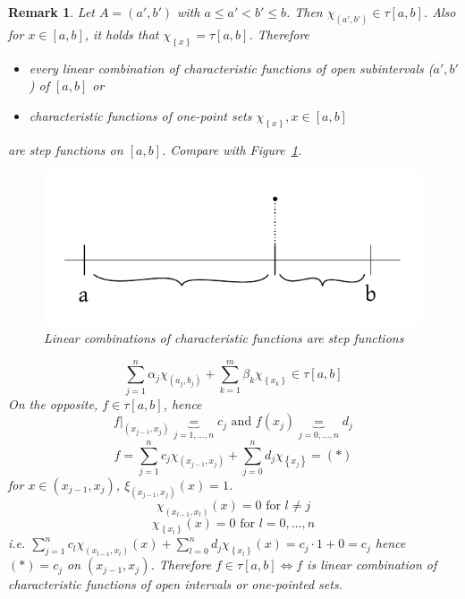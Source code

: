 \documentclass{article}
\newtheorem{remark}{Remark}  \numberwithin{remark}{section}
\newcommand{\set}[1]{\left\{#1\right\}}
\begin{document}
\begin{remark}
  Let $A = (a', b')$ with $a \leq a' < b' \leq b$.
  Then $\chi_{(a',b')} \in \tau[a,b]$. Also for $x \in [a,b]$, it holds that $\chi_{\set{x}} = \tau[a,b]$.
  Therefore
  \begin{itemize}
    \item every linear combination of characteristic functions of open subintervals ($a',b'$) of $[a,b]$ or
    \item characteristic functions of one-point sets $\chi_{\set{x}}, x \in [a,b]$
  \end{itemize}
  are step functions on $[a,b]$. Compare with Figure~\ref{img:linchar}.

  \begin{figure}[t]
    \begin{center}
      \includegraphics{img/13b_char_function_as_step_function.pdf}
      \caption{Linear combinations of characteristic functions are step functions}
      \label{img:linchar}
    \end{center}
  \end{figure}

  \[ \sum_{j=1}^n \alpha_j \chi_{(a_j,b_j)} + \sum_{k=1}^m \beta_k \chi_{\set{x_k}} \in \tau[a,b] \]
  On the opposite, $f \in \tau[a,b]$, hence
  \[ f|_{(x_{j-1},x_j)} \underbrace{=}_{j=1,\dots,n} c_j \text{ and } f(x_j) \underbrace{=}_{j=0,\dots,n} d_j \]
  \[ f = \sum_{j=1}^n c_j \chi_{(x_{j-1},x_j)} + \sum_{j=0}^n d_j \chi_{\set{x_j}} = (*) \]
  for $x \in (x_{j-1}, x_j)$, $\xi_{(x_{j-1},x_j)}(x) = 1$.
  \[ \chi_{(x_{l-1},x_l)}(x) = 0 \text{ for } l \neq j \]
  \[ \chi_{\set{x_l}}(x) = 0 \text{ for } l = 0, \dots, n \]
  i.e. $\sum_{j=1}^n c_l \chi_{(x_{l-1},x_l)}(x) + \sum_{l=0}^n d_j \chi_{\set{x_l}}(x) = c_j \cdot 1 + 0 = c_j$
  hence $(*) = c_j$ on $(x_{j-1}, x_j)$. Therefore $f \in \tau[a,b] \iff f$ is linear combination of characteristic functions
  of open intervals or one-pointed sets.
\end{remark}
\end{document}
